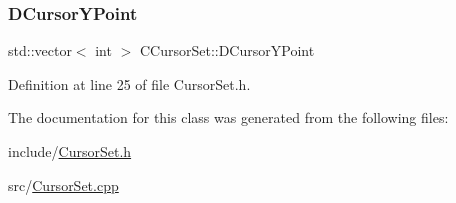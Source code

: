 \subsubsection{\texorpdfstring{D\+Cursor\+Y\+Point}{DCursorYPoint}}
{\footnotesize\ttfamily std\+::vector$<$ int $>$ C\+Cursor\+Set\+::\+D\+Cursor\+Y\+Point\hspace{0.3cm}{\ttfamily [protected]}}



Definition at line 25 of file Cursor\+Set.\+h.



The documentation for this class was generated from the following files\+:\begin{DoxyCompactItemize}
\item 
include/\hyperlink{CursorSet_8h}{Cursor\+Set.\+h}\item 
src/\hyperlink{CursorSet_8cpp}{Cursor\+Set.\+cpp}\end{DoxyCompactItemize}

